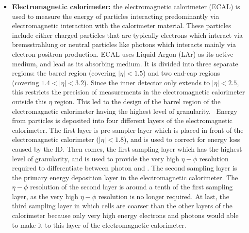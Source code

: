 \begin{itemize}
	\item \textbf{Electromagnetic calorimeter:} the electromagnetic calorimeter (ECAL) is used to measure the energy of particles interacting predominantly via electromagnetic interaction with the calorimeter material. These particles include either charged particles that are typically electrons which interact via bremsstrahlung or neutral particles like photons which interacts mainly via electron-positron production. ECAL uses Liquid Argon (LAr) as its active medium, and lead as its absorbing medium. It is divided into three separate regions: the barrel region (covering $|\eta|<1.5$) and two end-cap regions (covering $1.4<|\eta|<3.2$). Since the inner detector only extends to $|\eta|<2.5$, this restricts the precision of measurements in the electromagnetic calorimeter outside this $\eta$ region. This led to the design of the barrel region of the electromagnetic calorimeter having the highest level of granularity.~\cite{atlas} Energy from particles is deposited into four different layers of the electromagnetic calorimeter. The first layer is pre-sampler layer which is placed in front of the electromagnetic calorimeter ($|\eta|<1.8$), and is used to correct for energy loss caused by the ID. Then comes, the first sampling layer which has the highest level of granularity, and is used to provide the very high $\eta-\phi$ resolution required to differentiate between photon and \Pgpz. The second sampling layer is the primary energy deposition layer in the electromagnetic calorimeter. The $\eta-\phi$ resolution of the second layer is around a tenth of the first sampling layer, as the very high $\eta-\phi$ resolution is no longer required. At last, the third sampling layer in which cells are coarser than the other layers of the calorimeter because only very high energy electrons and photons would able to make it to this layer of the electromagnetic calorimeter.~\cite{atlas}
	

\end{itemize}

